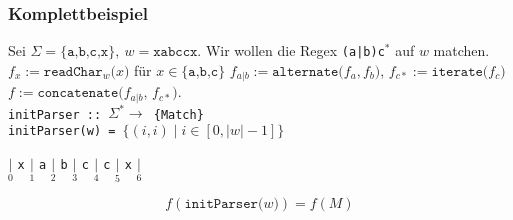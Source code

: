 \documentclass{beamer}
\begin{document}
    \begin{frame}[t,label=bsp]
        \frametitle{Komplettbeispiel}
        {\scriptsize
            Sei $\Sigma = \{\texttt{a,b,c,x}\},\ w = \texttt{xabccx}$. Wir wollen die Regex \texttt{(a|b)c$^\texttt{*}$} auf $w$ matchen. \\[5pt]
            \pause
            \pause
            $f_x := \texttt{readChar$_w$($x$)}$ für $x \in \{\texttt{a,b,c}\}$
            \qquad\qquad
            $f_{a|b} := \texttt{alternate($f_a, f_b$)}$,
            $f_{c*} := \texttt{iterate($f_c$)}$
            \qquad\qquad\qquad\qquad\qquad\quad
            $f := \texttt{concatenate($f_{a|b}$, $f_{c*}$)}$.\\
            \pause
            \texttt{initParser ::\ $\Sigma^* \to$ \{Match\}}\\
            \texttt{initParser(w) = $\{(i,i)\mid i \in [0,|w|-1]\}$}\\[5pt]
            \pause
            \pause
            \begin{center}
                $\underset{0}{|}$
                    {\large\texttt{x}}
                $\underset{1}{|}$
                    {\large\texttt{a}}
                $\underset{2}{|}$
                    {\large\texttt{b}}
                $\underset{3}{|}$
                    {\large\texttt{c}}
                $\underset{4}{|}$
                    {\large\texttt{c}}
                $\underset{5}{|}$
                    {\large\texttt{x}}
                $\underset{6}{|}$
            \end{center}
            $$
                f(\texttt{initParser($w$)})
                = f(M)
$$}
\end{frame}
\end{document}
